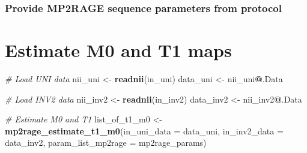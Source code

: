 \documentclass[]{article}
\newenvironment{Shaded}{\begin{snugshade}}{\end{snugshade}}
\newcommand{\CommentTok}[1]{\textcolor[rgb]{0.56,0.35,0.01}{\textit{#1}}}
\newcommand{\DataTypeTok}[1]{\textcolor[rgb]{0.13,0.29,0.53}{#1}}
\newcommand{\DecValTok}[1]{\textcolor[rgb]{0.00,0.00,0.81}{#1}}
\newcommand{\FloatTok}[1]{\textcolor[rgb]{0.00,0.00,0.81}{#1}}
\newcommand{\KeywordTok}[1]{\textcolor[rgb]{0.13,0.29,0.53}{\textbf{#1}}}
\newcommand{\NormalTok}[1]{#1}
\newcommand{\OperatorTok}[1]{\textcolor[rgb]{0.81,0.36,0.00}{\textbf{#1}}}
\newcommand{\OtherTok}[1]{\textcolor[rgb]{0.56,0.35,0.01}{#1}}
\newcommand{\StringTok}[1]{\textcolor[rgb]{0.31,0.60,0.02}{#1}}
\begin{document}
\hypertarget{provide-mp2rage-sequence-parameters-from-protocol}{%
\subsubsection{Provide MP2RAGE sequence parameters from
protocol}\label{provide-mp2rage-sequence-parameters-from-protocol}}

\begin{Shaded}
\end{Shaded}

\hypertarget{estimate-m0-and-t1-maps}{%
\section{Estimate M0 and T1 maps}\label{estimate-m0-and-t1-maps}}

\begin{Shaded}
\begin{Highlighting}[]
\CommentTok{# Load UNI data}
\NormalTok{nii_uni <-}\StringTok{ }\KeywordTok{readnii}\NormalTok{(in_uni)}
\NormalTok{data_uni <-}\StringTok{ }\NormalTok{nii_uni}\OperatorTok{@}\NormalTok{.Data}

\CommentTok{# Load INV2 data}
\NormalTok{nii_inv2 <-}\StringTok{ }\KeywordTok{readnii}\NormalTok{(in_inv2)}
\NormalTok{data_inv2 <-}\StringTok{ }\NormalTok{nii_inv2}\OperatorTok{@}\NormalTok{.Data}

\CommentTok{# Estimate M0 and T1}
\NormalTok{list_of_t1_m0 <-}\StringTok{ }\KeywordTok{mp2rage_estimate_t1_m0}\NormalTok{(}\DataTypeTok{in_uni_data =}\NormalTok{ data_uni,}
                                        \DataTypeTok{in_inv2_data =}\NormalTok{ data_inv2,}
                                        \DataTypeTok{param_list_mp2rage =}\NormalTok{ mp2rage_params)}
\end{Highlighting}
\end{Shaded}
\end{document}
